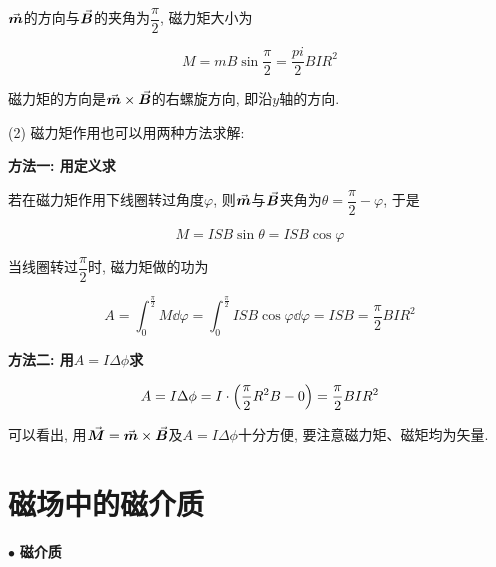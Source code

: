 \begin{example}
\begin{solution}
		$\va*{m}$的方向与$\va*{B}$的夹角为$\dfrac{\pi}{2}$, 磁力矩大小为
		
		\begin{equation*}
			M = m B \sin\dfrac{\pi}{2} = \dfrac{pi}{2} BIR^2
		\end{equation*}
		
		磁力矩的方向是$\va*{m} \times \va*{B}$的右螺旋方向, 即沿$y$轴的方向.
		
		(2) 磁力矩作用也可以用两种方法求解: 
		
		\textbf{方法一: 用定义求}
		
		若在磁力矩作用下线圈转过角度$\varphi$, 则$\va*{m}$与$\va*{B}$夹角为$\theta = \dfrac{\pi}{2} - \varphi$, 于是
		
		\begin{equation*}
			M = ISB \sin\theta = ISB\cos\varphi
		\end{equation*}
		
		当线圈转过$\dfrac{\pi}{2}$时, 磁力矩做的功为
		
		\begin{equation*}
			A = \int_{0}^{\frac{\pi}{2}} M \dd{\varphi} = \int_{0}^{\frac{\pi}{2}} ISB \cos\varphi \dd{\varphi} = ISB = \dfrac{\pi}{2} BIR^2
		\end{equation*}
		
		\textbf{方法二: 用$A = I \Delta \phi$求}
		
		\begin{equation*}
			A = I\Delta \phi = I \cdot \qty(\dfrac{\pi}{2} R^2 B - 0) = \dfrac{\pi}{2} BIR^2
		\end{equation*}
		
		可以看出, 用$\va*{M} = \va*{m} \times \va*{B}$及$A = I \Delta \phi$十分方便, 要注意磁力矩、磁矩均为矢量. 
		
	\end{solution}
	
\end{example}

\section{磁场中的磁介质}\label{8.6}

$\bullet$ \textbf{磁介质}

